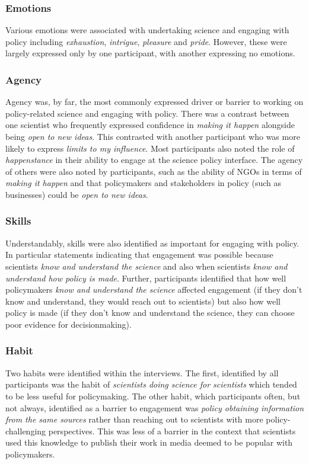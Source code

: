 \subsubsection{Emotions}\label{sec:resismemotions}
Various emotions were associated with undertaking science and engaging with policy including \emph{exhaustion}, \emph{intrigue}, \emph{pleasure} and \emph{pride}. However, these were largely expressed only by one participant, with another expressing no emotions.

\subsubsection{Agency}\label{sec:resismagency}
Agency was, by far, the most commonly expressed driver or barrier to working on policy-related science and engaging with policy. There was a contrast between one scientist who frequently expressed confidence in \emph{making it happen} alongside being \emph{open to new ideas}. This contrasted with another participant who was more likely to express \emph{limits to my influence}. Most participants also noted the role of \emph{happenstance} in their ability to engage at the science policy interface. The agency of others were also noted by participants, such as the ability of NGOs in terms of \emph{making it happen} and that policymakers and stakeholders in policy (such as businesses) could be \emph{open to new ideas}.

\subsubsection{Skills}\label{sec:resismskills}
Understandably, skills were also identified as important for engaging with policy. In particular statements indicating that engagement was possible because scientists \emph{know and understand the science} and also when scientists \emph{know and understand how policy is made}. Further, participants identified that how well policymakers \emph{know and understand the science} affected engagement (if they don't know and understand, they would reach out to scientists) but also how well policy is made (if they don't know and understand the science, they can choose poor evidence for decisionmaking).

\subsubsection{Habit}\label{sec:resismhabit}
Two habits were identified within the interviews. The first, identified by all participants was the habit of \emph{scientists doing science for scientists} which tended to be less useful for policymaking. The other habit, which participants often, but not always, identified as a barrier to engagement was \emph{policy obtaining information from the same sources} rather than reaching out to scientists with more policy-challenging perspectives. This was less of a barrier in the context that scientists used this knowledge to publish their work in media deemed to be popular with policymakers.


